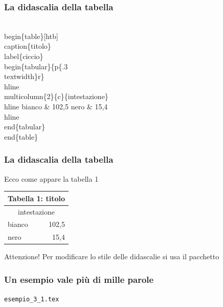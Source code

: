 \documentclass[svgnames,%
	ucs,%
	pdftex]{guitbeamer}
\begin{document}
\begin{frame}
  \frametitle{La didascalia della tabella}
	\begin{LaTeXcode}
		\\begin\{table\}[htb]\alert{\\caption\{titolo\}\\label\{ciccio\}}\n
		\\begin\{tabular\}\{p\{.3\\textwidth\}r\}\
		\\hline \n
		\\multicolumn\{2\}\{c\}\{intestazione\}\bs\bs \
		\\hline \n
		\hspace*{5ex}bianco \& 102,5 \bs\bs\n
		\hspace*{5ex}nero   \& 15,4 \bs\bs\
		\\hline\n
		\\end\{tabular\}\n
		\\end\{table\}
	\end{LaTeXcode}
\end{frame}
\begin{frame}
  \frametitle{La didascalia della tabella}
	Ecco come appare la tabella 1
	\begin{LaTeXoutput}
	  \begin{center}
		\begin{table}
		\begin{tabular}{p{}r}
		\multicolumn{2}{c}{Tabella 1: titolo}\\[1ex]\hline %
		\multicolumn{2}{c}{intestazione}\\\hline
		bianco & 102,5 \\
		nero   & 15,4 \\\hline
		\end{tabular}
		\end{table}
	  \end{center}
	\end{LaTeXoutput}
  \bigskip
	\begin{block}{Attenzione!}
		Per modificare lo stile delle didascalie si usa il pacchetto 
	\end{block}
\end{frame}
\begin{frame}
  \frametitle{Un esempio vale pi\`u di mille parole}
	\begin{center}
		\alert{\texttt{esempio\_3\_1.tex}}
	\end{center}
\end{frame}
\end{document}
